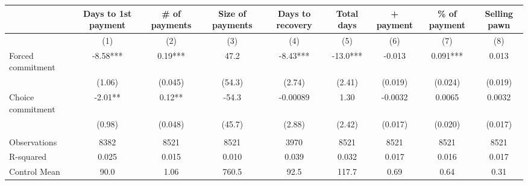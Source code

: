 \begin{tabular}{lcccccccc}
\toprule
      & Days to 1st payment & \# of payments & Size of payments & Days to recovery & Total days & + payment & \% of payment & Selling pawn \\
\midrule
      & (1)   & (2)   & (3)   & (4)   & (5)   & (6)   & (7)   & (8) \\
\midrule
\midrule
Forced commitment & -8.58*** & 0.19*** & 47.2  & -8.43*** & -13.0*** & -0.013 & 0.091*** & 0.013 \\
      & (1.06) & (0.045) & (54.3) & (2.74) & (2.41) & (0.019) & (0.024) & (0.019) \\
Choice commitment & -2.01** & 0.12** & -54.3 & -0.00089 & 1.30  & -0.0032 & 0.0065 & 0.0032 \\
      & (0.98) & (0.048) & (45.7) & (2.88) & (2.42) & (0.017) & (0.020) & (0.017) \\
      &       &       &       &       &       &       &       &  \\
\midrule
Observations & 8382  & 8521  & 8521  & 3970  & 8521  & 8521  & 8521  & 8521 \\
R-squared & 0.025 & 0.015 & 0.010 & 0.039 & 0.032 & 0.017 & 0.016 & 0.017 \\
Control Mean & 90.0  & 1.06  & 760.5 & 92.5  & 117.7 & 0.69  & 0.64  & 0.31 \\
\bottomrule
\bottomrule
\end{tabular}%
